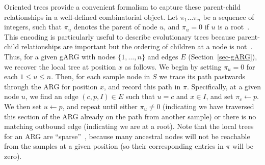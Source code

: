 \documentclass{article}
\begin{document}
Oriented trees provide a
convenient formalism to capture these parent-child relationships
in a well-defined combinatorial object.
Let $\pi_1\dots\pi_n$ be a sequence of integers, such that $\pi_u$
denotes the parent of node $u$, and $\pi_u = 0$ if $u$ is a
root~\cite[p.\ 461]{knuth11combinatorial}.
This encoding is particularly useful to describe
evolutionary trees because parent-child relationships are
important but the ordering of children at a node is
not~\citep{kelleher2013coalescent,kelleher2014coalescent,
kelleher2016efficient}.
Thus, for a given gARG with nodes $\{1, \dots, n\}$ and
edges $E$ (Section~\ref{sec-gARG}), we recover the local tree
at position $x$ as follows.
We begin by setting $\pi_u = 0$ for each $1 \leq u \leq n$.
Then, for each sample node in $S$ we trace its path pastwards through the
ARG for position $x$, and record this path in $\pi$.
Specifically, at a given node $u$,
we find an edge $(c, p, I) \in E$ such that $u = c$ and $x \in I$, and set
$\pi_c \leftarrow p$. We then set $u \leftarrow p$, and repeat
until either $\pi_u \neq 0$ (indicating we have traversed this section
of the ARG already on the path from another sample) or there
is no matching outbound edge (indicating we are at a root).
Note that the local trees for an ARG are ``sparse''~\citep{kelleher2016efficient},
because many ancestral nodes will not be reachable from the
samples at a given position (so their corresponding entries in $\pi$ will be zero).
\end{document}
